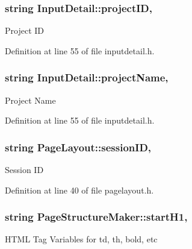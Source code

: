 \hypertarget{classInputDetail_a08069ee622c626c038b821ddcc7427b4}{
\subsubsection[{project\-I\-D}]{\setlength{\rightskip}{0pt plus 5cm}string Input\-Detail\-::project\-I\-D\hspace{0.3cm}{\ttfamily [protected]}, {\ttfamily [inherited]}}}\label{classInputDetail_a08069ee622c626c038b821ddcc7427b4}
Project I\-D 

Definition at line 55 of file inputdetail.\-h.

\hypertarget{classInputDetail_aaaf51475a2a4ddbe34e38c96bdb45bad}{
\subsubsection[{project\-Name}]{\setlength{\rightskip}{0pt plus 5cm}string Input\-Detail\-::project\-Name\hspace{0.3cm}{\ttfamily [protected]}, {\ttfamily [inherited]}}}\label{classInputDetail_aaaf51475a2a4ddbe34e38c96bdb45bad}
Project Name 

Definition at line 55 of file inputdetail.\-h.

\hypertarget{classPageLayout_ab796c4a12a3f9c089881085e508e2a1c}{
\subsubsection[{session\-I\-D}]{\setlength{\rightskip}{0pt plus 5cm}string Page\-Layout\-::session\-I\-D\hspace{0.3cm}{\ttfamily [protected]}, {\ttfamily [inherited]}}}\label{classPageLayout_ab796c4a12a3f9c089881085e508e2a1c}
Session I\-D 

Definition at line 40 of file pagelayout.\-h.

\hypertarget{classPageStructureMaker_af41d4e21b808f5f8dc2c727f775b6fb2}{
\subsubsection[{start\-H1}]{\setlength{\rightskip}{0pt plus 5cm}string Page\-Structure\-Maker\-::start\-H1\hspace{0.3cm}{\ttfamily [protected]}, {\ttfamily [inherited]}}}\label{classPageStructureMaker_af41d4e21b808f5f8dc2c727f775b6fb2}
H\-T\-M\-L Tag Variables for td, th, bold, etc 

